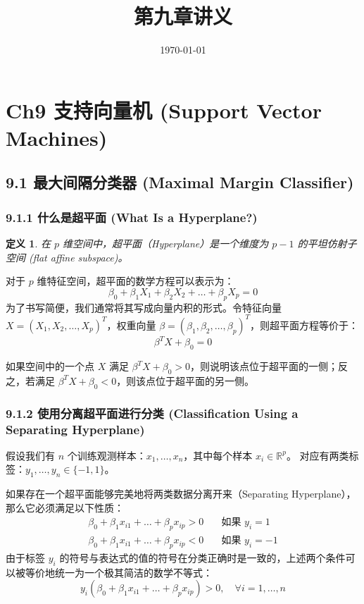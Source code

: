 \documentclass[UTF8]{ctexart}
\title{第九章讲义}
\author{}
\date{\today}
\newtheorem{definition}[theorem]{定义}
\numberwithin{equation}{section}
\newcommand{\RR}{\mathbb{R}}
\begin{document}
\maketitle

\section{Ch9 支持向量机 (Support Vector Machines)}

\subsection{9.1 最大间隔分类器 (Maximal Margin Classifier)}

\subsubsection{9.1.1 什么是超平面 (What Is a Hyperplane?)}

\begin{definition}
在 $p$ 维空间中，超平面（Hyperplane）是一个维度为 $p-1$ 的平坦仿射子空间 (flat affine subspace)。
\end{definition}

对于 $p$ 维特征空间，超平面的数学方程可以表示为：
\begin{equation}
\beta_0 + \beta_1 X_1 + \beta_2 X_2 + \dots + \beta_p X_p = 0
\end{equation}
为了书写简便，我们通常将其写成向量内积的形式。令特征向量 $X = (X_1, X_2, \dots, X_p)^T$，权重向量 $\beta = (\beta_1, \beta_2, \dots, \beta_p)^T$，则超平面方程等价于：
\begin{equation}
\beta^T X + \beta_0 = 0
\end{equation}

如果空间中的一个点 $X$ 满足 $\beta^T X + \beta_0 > 0$，则说明该点位于超平面的一侧；反之，若满足 $\beta^T X + \beta_0 < 0$，则该点位于超平面的另一侧。

\subsubsection{9.1.2 使用分离超平面进行分类 (Classification Using a Separating Hyperplane)}

假设我们有 $n$ 个训练观测样本：$x_1, \dots, x_n$，其中每个样本 $x_i \in \RR^p$。
对应有两类标签：$y_1, \dots, y_n \in \{-1, 1\}$。

如果存在一个超平面能够完美地将两类数据分离开来（Separating Hyperplane），那么它必须满足以下性质：
\begin{align}
\beta_0 + \beta_1 x_{i1} + \dots + \beta_p x_{ip} > 0 &\quad \text{如果 } y_i = 1 \\
\beta_0 + \beta_1 x_{i1} + \dots + \beta_p x_{ip} < 0 &\quad \text{如果 } y_i = -1
\end{align}
由于标签 $y_i$ 的符号与表达式的值的符号在分类正确时是一致的，上述两个条件可以被等价地统一为一个极其简洁的数学不等式：
\begin{equation}
y_i (\beta_0 + \beta_1 x_{i1} + \dots + \beta_p x_{ip}) > 0, \quad \forall i = 1, \dots, n
\end{equation}
\end{document}
